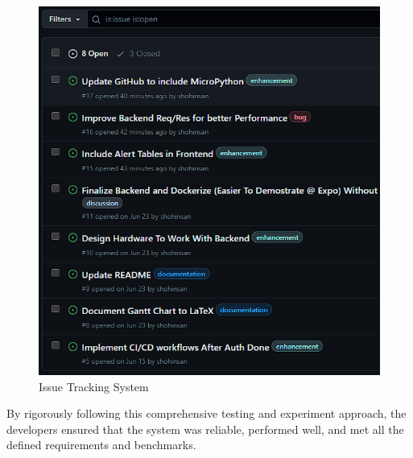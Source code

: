 \begin{figure}[htbp]
      \centering
      \includegraphics[width=1\linewidth]{datasets/images/GitHubIssues.png}
      \caption{Issue Tracking System}
      \label{fig:gitIssues}
\end{figure}

By rigorously following this comprehensive testing and experiment
approach, the developers ensured that the system was reliable,
performed well, and met all the defined requirements and benchmarks. %